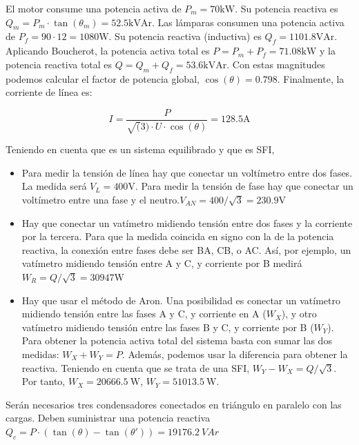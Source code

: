 \documentclass[12pt]{article}
\begin{document}
\noindent\hrulefill

El motor consume una potencia activa de $P_m = 70\mathrm{kW}$. Su
potencia reactiva es
$Q_m = P_m \cdot \tan(\theta_m) = 52.5\mathrm{kVAr}$.  Las lámparas
consumen una potencia activa de $P_f = 90 \cdot 12 =
1080\mathrm{W}$. Su potencia reactiva (inductiva) es
$Q_f = 1101.8\mathrm{VAr}$.  Aplicando Boucherot, la potencia activa
total es $P = P_m + P_f = 71.08\mathrm{kW}$ y la potencia reactiva
total es $Q = Q_m + Q_f = 53.6\mathrm{kVAr}$. Con estas magnitudes
podemos calcular el factor de potencia global, $\cos(\theta) =
0.798$. Finalmente, la corriente de línea es:

\[
  I = \frac{P}{\sqrt(3) \cdot U \cdot \cos(\theta)} = 128.5\mathrm{A}
\]


Teniendo en cuenta que es un sistema equilibrado y que es SFI,

\begin{itemize}

\item Para medir la tensión de línea hay que conectar un voltímetro
  entre dos fases. La medida será $V_{L} = 400\mathrm{V}$. Para medir
  la tensión de fase hay que conectar un voltímetro entre una fase y
  el neutro.$V_{AN} = 400 / \sqrt{3} = 230.9\mathrm{V}$

\item Hay que conectar un vatímetro midiendo tensión entre dos fases y
  la corriente por la tercera. Para que la medida coincida en signo
  con la de la potencia reactiva, la conexión entre fases debe ser BA,
  CB, o AC. Así, por ejemplo, un vatímetro midiendo tensión entre A y
  C, y corriente por B medirá $W_R = Q / \sqrt{3} = 30947\mathrm{W}$

\item Hay que usar el método de Aron. Una posibilidad es conectar un
  vatímetro midiendo tensión entre las fases A y C, y corriente en A
  ($W_X$), y otro vatímetro midiendo tensión entre las fases B y C, y
  corriente por B ($W_Y$). Para obtener la potencia activa total del
  sistema basta con sumar las dos medidas: $W_{X} + W_{Y} =
  P$. Además, podemos usar la diferencia para obtener la
  reactiva. Teniendo en cuenta que se trata de una SFI,
  $W_Y - W_X = Q/\sqrt{3}$. Por tanto, $W_X = \SI{20666.5}{\watt}$,
  $W_Y = \SI{51013.5}{\watt}$.

\end{itemize}


Serán necesarios tres condensadores conectados en triángulo en
paralelo con las cargas. Deben suministrar una potencia reactiva
$Q_c = P \cdot (\tan(\theta) - \tan(\theta')) = \SI{19176.2}{VAr}$
\end{document}
